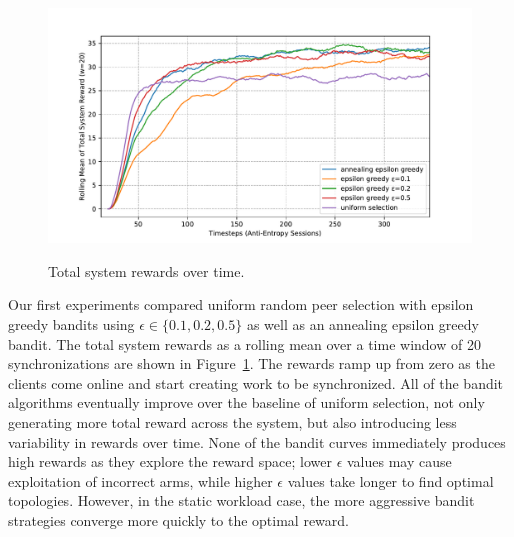\begin{figure}
    \begin{center}
        \includegraphics[width=5in]{figures/ch06_rewards.pdf}
    \end{center}
    \renewcommand{\baselinestretch}{1}
    \small\normalsize

    \begin{quote}
        \caption[Bandit Rewards]{Total system rewards over time.}
        \label{fig:ch06_rewards}
    \end{quote}
\end{figure}
\renewcommand{\baselinestretch}{2}
\small\normalsize

Our first experiments compared uniform random peer selection with epsilon
greedy bandits using $\epsilon \in \{0.1, 0.2, 0.5\}$ as well as an annealing
epsilon greedy bandit.
The total system rewards as a rolling mean over a time window of 20
synchronizations are shown in Figure~\ref{fig:ch06_rewards}.
The rewards ramp up from zero as the clients come online and start
creating work to be synchronized.
All of the bandit algorithms eventually improve over the baseline of uniform
selection, not only generating more total reward across the system, but also
introducing less variability in rewards over time.
None of the bandit curves immediately produces high rewards as they explore
the reward space; lower $\epsilon$ values may cause exploitation of incorrect
arms, while higher $\epsilon$ values take longer to find optimal topologies.
However, in the static workload case, the more aggressive bandit strategies
converge more quickly to the optimal reward.

